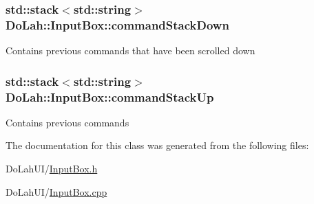 \subsubsection[{command\+Stack\+Down}]{\setlength{\rightskip}{0pt plus 5cm}std\+::stack$<$std\+::string$>$ Do\+Lah\+::\+Input\+Box\+::command\+Stack\+Down}\label{class_do_lah_1_1_input_box_aedbae7556a9b89922bc005550d86aeb8}
Contains previous commands that have been scrolled down \hypertarget{class_do_lah_1_1_input_box_a429fbfb31340bc3f638549bdc0ad2f5f}{}
\subsubsection[{command\+Stack\+Up}]{\setlength{\rightskip}{0pt plus 5cm}std\+::stack$<$std\+::string$>$ Do\+Lah\+::\+Input\+Box\+::command\+Stack\+Up}\label{class_do_lah_1_1_input_box_a429fbfb31340bc3f638549bdc0ad2f5f}
Contains previous commands 

The documentation for this class was generated from the following files\+:\begin{DoxyCompactItemize}
\item 
Do\+Lah\+U\+I/\hyperlink{_input_box_8h}{Input\+Box.\+h}\item 
Do\+Lah\+U\+I/\hyperlink{_input_box_8cpp}{Input\+Box.\+cpp}\end{DoxyCompactItemize}
